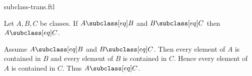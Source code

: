 \documentclass{article}
\begin{document}
\begin{smodule}[creators={Marcel Schütz}]{subclass-trans.ftl}

  \begin{fproposition*}[label=3939677545431040]
    Let $A, B, C$ be classes.
    If $A \subclass[eq] B$ and $B \subclass[eq] C$ then $A \subclass[eq] C$.
  \end{fproposition*}
  \begin{fproof}
    Assume $A \subclass[eq] B$ and $B \subclass[eq] C$.
    Then every element of $A$ is contained in $B$ and every element of $B$ is contained in $C$.
    Hence every element of $A$ is contained in $C$.
    Thus $A \subclass[eq] C$.
  \end{fproof}
\end{smodule}
\end{document}
